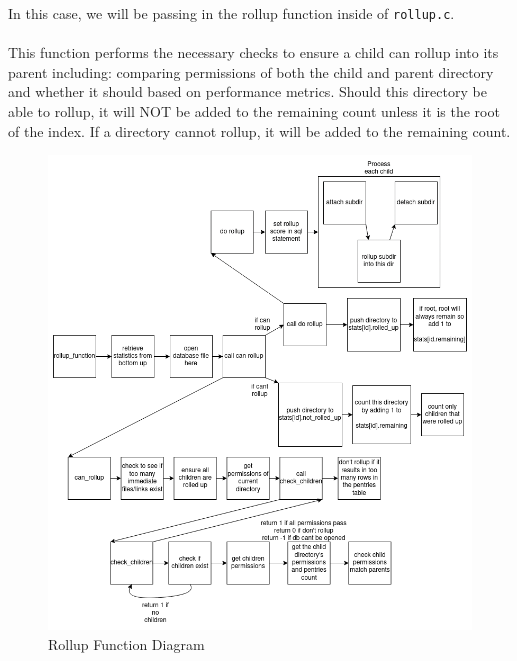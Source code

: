 In this case, we will be passing in the rollup function inside of \texttt{rollup.c}.
\\
\\
This function performs the necessary checks to ensure a child can rollup into its parent including: comparing permissions of both the child and parent directory and whether it should based on performance metrics. Should this directory be able to rollup, it will NOT be added to the remaining count unless it is the root of the index. If a directory cannot rollup, it will be added to the remaining count.

\begin{figure} [h]
\centering
\includegraphics[height=0.45\textheight]{images/rollup_function.png}
\caption{\label{fig:rollup_function} Rollup Function Diagram}
\end{figure}

\clearpage